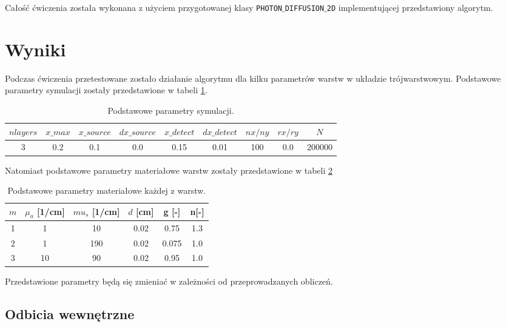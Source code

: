 \documentclass[a4paper, 12pt]{article}
\begin{document}
	\noindent Całość ćwiczenia została wykonana z użyciem przygotowanej klasy \texttt{PHOTON$\_$DIFFUSION$\_$2D} implementującej przedstawiony algorytm.

	\section*{Wyniki}
	
	Podczas ćwiczenia przetestowane zostało działanie algorytmu dla kilku parametrów warstw w układzie trójwarstwowym. 
	Podstawowe parametry symulacji zostały przedstawione w tabeli \ref{tab:params}.
	
	\begin{table}[H]
	\centering
	\caption{Podstawowe parametry symulacji.}
	\label{tab:params}
		\begin{tabular}{|c|c|c|c|c|c|c|c|c|}
			\hline
			\rowcolor{LightCyan}
			$nlayers$ & $x\_max$ & $x\_source$ & $dx\_source$ & $x\_detect$ & $dx\_detect$ & $nx/ny$ & $rx/ry$ & $N$ \\ \hline
			3 & 0.2 & 0.1 & 0.0 & 0.15 & 0.01 & 100 & 0.0 & 200000 \\   
			\hline  
		\end{tabular}
	\end{table}
	
	\noindent Natomiast podstawowe parametry materiałowe warstw zostały przedstawione w tabeli \ref{tab:lay_params}
	\begin{table}[H]
		\centering
		\caption{Podstawowe parametry materiałowe każdej z warstw.}
		\label{tab:lay_params}
		\begin{tabular}{|c|c|c|c|c|c|}
			\hline
			\rowcolor{LightCyan}
			$m$ & $\mu_a$ [1/cm] & $mu_s$ [1/cm] & $d$ [cm] & g [-] & n[-] \\ \hline
			1 & 1 & 10 & 0.02 & 0.75 & 1.3 \\ \hline
			2 & 1 & 190 & 0.02 & 0.075 & 1.0 \\ \hline
			3 & 10 & 90 & 0.02 & 0.95 & 1.0 \\
			\hline  
		\end{tabular}
	\end{table}
	
	\noindent Przedstawione parametry będą się zmieniać w zależności od przeprowadzanych obliczeń.
	
	
	\subsection*{Odbicia wewnętrzne}
	
\end{document}
